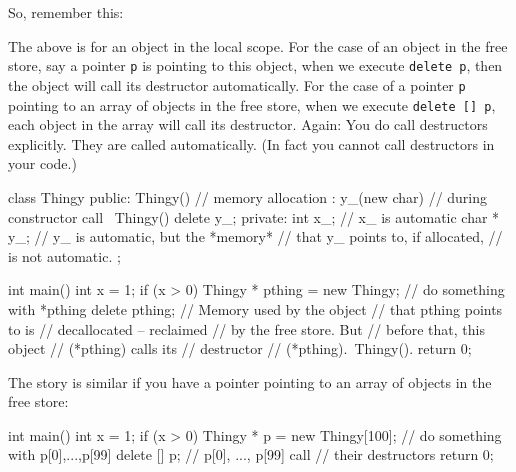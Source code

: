 So, remember this: 








\newpage{}

The above is for an object in the local scope. For the case of an object
in the free store, say a pointer \texttt{p} is pointing to this object,
when we execute \texttt{delete p}, then the object will call its
destructor automatically. For the case of a pointer \texttt{p} pointing to
an array of objects in the free store, when we execute \texttt{delete
[] p}, each object in the array will call its destructor. Again: You
do  call destructors explicitly. They are called
automatically. (In fact you cannot call destructors in your code.)

\begin{consolethree}[escapeinside=||]
class Thingy
{
public:
    Thingy()             // memory allocation
        : y_(new char)   // during constructor call
    {}
    ~Thingy()
    {
        delete y_;
    }
private:
    int x_;     // x_ is automatic
    char * y_;  // y_ is automatic, but the *memory*
                // that y_ points to, if allocated,
                // is not automatic.
};

int main()
{
    int x = 1;
    if (x > 0)
    {
        Thingy * pthing = new Thingy;
        // do something with *pthing
        delete pthing; // Memory used by the object
                       // that pthing points to is
                       // decallocated -- reclaimed
                       // by the free store. But
                       // before that, this object
                       // (*pthing) calls its
                       // destructor
                       // (*pthing).~Thingy().
    }
    return 0;
}
\end{consolethree}

The story is similar if you have a pointer pointing to an array of
objects in the free store:

\begin{consolethree}[escapeinside=||]
int main()
{
    int x = 1;
    if (x > 0)
    {
        Thingy * p = new Thingy[100];
        // do something with p[0],...,p[99]
        delete [] p; // p[0], ..., p[99] call
                     // their destructors
    }
    return 0;
}
\end{consolethree}



